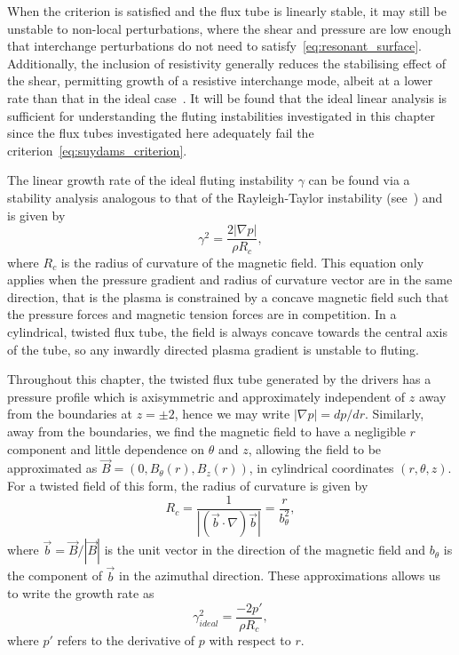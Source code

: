When the criterion is satisfied and the flux tube is linearly stable, it may still be unstable to non-local perturbations, where the shear and pressure are low enough that interchange perturbations do not need to satisfy~\ref{eq:resonant_surface}. Additionally, the inclusion of resistivity generally reduces the stabilising effect of the shear, permitting growth of a resistive interchange mode, albeit at a lower rate than that in the ideal case~\cite{mikhailovskiiInstabilitiesConfinedPlasma1998}. It will be found that the ideal linear analysis is sufficient for understanding the fluting instabilities investigated in this chapter since the flux tubes investigated here adequately fail the criterion~\ref{eq:suydams_criterion}.

The linear growth rate of the ideal fluting instability $\gamma$ can be found via a stability analysis analogous to that of the Rayleigh-Taylor instability (see~\cite{goldstonIntroductionPlasmaPhysics2020}) and is given by
\begin{equation}
  \label{eq:fluting_growth_rate}
\gamma^2 = \frac{2|\nabla p|}{\rho R_c},
\end{equation}
where $R_c$ is the radius of curvature of the magnetic field. This equation only applies when the pressure gradient and radius of curvature vector are in the same direction, that is the plasma is constrained by a concave magnetic field such that the pressure forces and magnetic tension forces are in competition. In a cylindrical, twisted flux tube, the field is always concave towards the central axis of the tube, so any inwardly directed plasma gradient is unstable to fluting.


Throughout this chapter, the twisted flux tube generated by the drivers has a pressure profile which is axisymmetric and approximately independent of $z$ away from the boundaries at $z=\pm2$, hence we may write $|\nabla p| = d p/ dr$. Similarly, away from the boundaries, we find the magnetic field to have a negligible $r$ component and little dependence on $\theta$ and $z$, allowing the field to be approximated as $\vec{B} = (0, B_{\theta}(r), B_z(r))$, in cylindrical coordinates $(r, \theta, z)$. For a twisted field of this form, the radius of curvature is given by 
\begin{equation}
  \label{eq:radius_of_curvature}
  R_c = \frac{1}{|(\vec{b}\cdot\nabla) \vec{b}|} = \frac{r}{b_{\theta}^2},
\end{equation}
where $\vec{b} = \vec{B}/|\vec{B}|$ is the unit vector in the direction of the magnetic field and $b_{\theta}$ is the component of $\vec{b}$ in the azimuthal direction. These approximations allows us to write the growth rate as
\begin{equation}
  \label{eq:fluting_growth_rate2}
\gamma_{ideal}^2 = \frac{-2p'}{\rho R_c},
\end{equation}
where $p'$ refers to the derivative of $p$ with respect to $r$.

